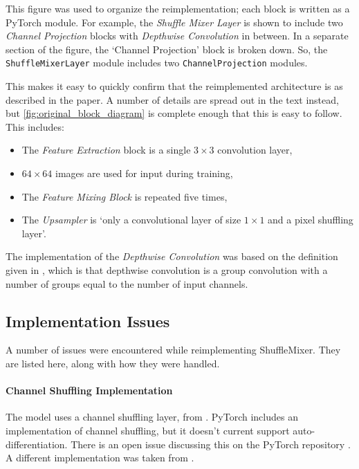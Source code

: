 \documentclass{article}
\begin{document}
    This figure was used to organize the reimplementation; each block is written as a PyTorch module. For example, the {\em Shuffle Mixer Layer} is shown to include two {\em Channel Projection} blocks with {\em Depthwise Convolution} in between. In a separate section of the figure, the `Channel Projection' block is broken down. So, the {\tt ShuffleMixerLayer} module includes two {\tt ChannelProjection} modules.

    This makes it easy to quickly confirm that the reimplemented architecture is as described in the paper. A number of details are spread out in the text instead, but \cref{fig:original_block_diagram} is complete enough that this is easy to follow. This includes:

    \begin{itemize}
        \item The {\em Feature Extraction} block is a single $3\times3$ convolution layer,
        \item $64\times64$ images are used for input during training,
        \item The {\em Feature Mixing Block} is repeated five times,
        \item The {\em Upsampler} is `only a convolutional layer of size $1\times1$ and a pixel shuffling layer'.
    \end{itemize}

    The implementation of the {\em Depthwise Convolution} was based on the definition given in \citet{liu2022convnet}, which is that depthwise convolution is a group convolution with a number of groups equal to the number of input channels.

    \subsection{Implementation Issues} \label{sec: imp issues}

    A number of issues were encountered while reimplementing ShuffleMixer. They are listed here, along with how they were handled.

    \paragraph{Channel Shuffling Implementation} The model uses a channel shuffling layer, from \citet{zhang2017shufflenet}. PyTorch includes an implementation of channel shuffling, but it doesn't current support auto-differentiation. There is an open issue discussing this on the PyTorch repository \citep{PytorchChannelShuffleIssueGithub}. A different implementation was taken from \citet{KuangliuGitHub}.
\end{document}
